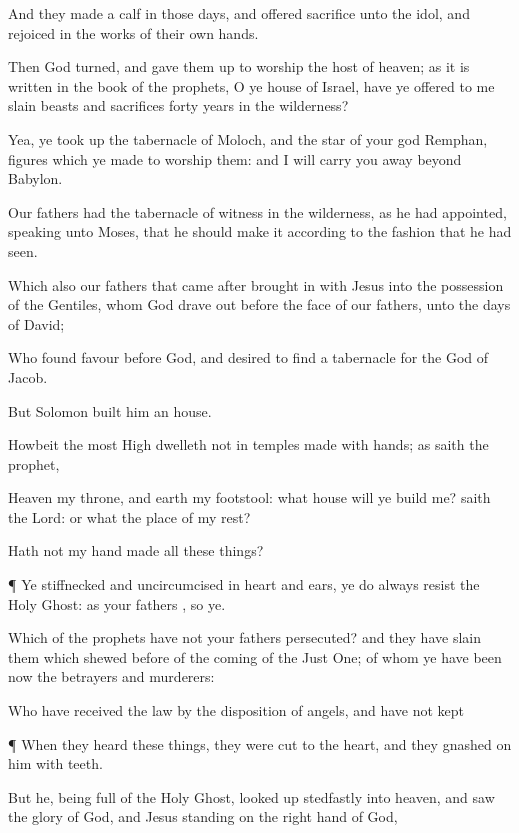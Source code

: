 {And they made a
calf
in
those
days,
and
offered
sacrifice unto the
idol,
and
rejoiced
in the
works of their
own
hands.

Then
God
turned,
and
gave
them
up to
worship the
host of
heaven;
as it is
written
in the
book of the
prophets, O ye
house of
Israel, have ye
offered to
me slain
beasts
and
sacrifices
{}
forty
years
in the
wilderness?

Yea, ye took
up the
tabernacle of
Moloch,
and the
star
of
your
god
Remphan,
figures
which ye
made to
worship
them:
and I will
carry
you
away
beyond
Babylon.

Our
fathers
had the
tabernacle of
witness
in the
wilderness,
as he had
appointed,
speaking unto
Moses, that he should
make
it according
to the
fashion
that he had
seen.

Which
also
our
fathers that came
after brought
in
with
Jesus
into the
possession of the
Gentiles,
whom
God drave
out
before the
face
of
our
fathers,
unto the
days of
David;

Who
found
favour
before
God,
and
desired to
find a
tabernacle for the
God of
Jacob.

But
Solomon
built
him an
house.

Howbeit the most
High
dwelleth
not
in
temples made with
hands;
as
saith the
prophet,

Heaven
{}
my
throne,
and
earth
{}
my
footstool:
what
house will ye
build
me?
saith the
Lord:
or
what
{} the
place
of
my
rest?

Hath
not
my
hand
made
all these
things?


\par }{\PP {}¶
Ye
stiffnecked
and
uncircumcised in
heart
and
ears, ye
do
always
resist
the
Holy
Ghost:
as
your
fathers
{},
so
{}
ye.

Which of the
prophets
have
not
your
fathers
persecuted?
and they have
slain them
which shewed
before
of the
coming of the Just
One; of
whom
ye have
been
now the
betrayers
and
murderers:

Who have
received the
law
by the
disposition of
angels,
and
have
not
kept
{}


\par }{\PP {}¶
When they
heard these
things, they were
cut to the
heart,
and they
gnashed
on
him
with
{}
teeth.

But he,
being
full of
the
Holy
Ghost,
looked
up
stedfastly
into
heaven,
and
saw the
glory of
God,
and
Jesus
standing
on the right
hand of
God,

}
